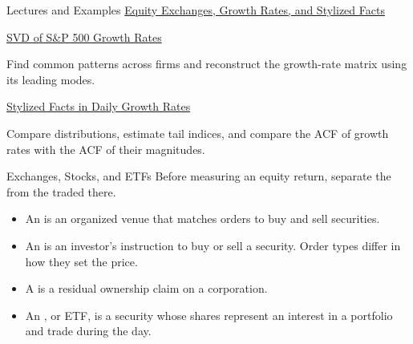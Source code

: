 \documentclass[aspectratio=169,11pt]{beamer}
\begin{document}
\begin{frame}{Lectures and Examples}
  \textbf{}
  \href{https://github.com/varnerlab/CHEME-5660-CourseRepository-Fall-2026/blob/main/lectures/week-3/L3a/CHEME-5660-L3a-Lecture-Equity-Exchanges-Return-StylizedFacts-Fall-2026.ipynb}{Equity Exchanges, Growth Rates, and Stylized Facts}

  \vspace{1.1em}
  \textbf{}
  \href{https://github.com/varnerlab/CHEME-5660-CourseRepository-Fall-2026/blob/main/lectures/week-3/L3a/CHEME-5660-L3a-SVD-SP500-Example-Fall-2026.ipynb}{SVD of S\&P 500 Growth Rates}

  Find common patterns across firms and reconstruct the growth-rate matrix
  using its leading modes.

  \vspace{1.1em}
  \textbf{}
  \href{https://github.com/varnerlab/CHEME-5660-CourseRepository-Fall-2026/blob/main/lectures/week-3/L3a/CHEME-5660-L3a-StylizedFacts-Example-Fall-2026.ipynb}{Stylized Facts in Daily Growth Rates}

  Compare distributions, estimate tail indices, and compare the ACF of
  growth rates with the ACF of their magnitudes.
\end{frame}

\begin{frame}{Exchanges, Stocks, and ETFs}
  \vspace{0.3em}
  Before measuring an equity return, separate the  from the
   traded there.

  \vspace{0.7em}
  \begin{itemize}\setlength{\itemsep}{0.6em}
    \item An  is an organized venue that matches orders to buy
      and sell securities.
    \item An  is an investor's instruction to buy or sell a
      security. Order types differ in how they set the price.
    \item A  is a residual ownership claim on a corporation.
    \item An , or ETF, is a security whose shares
      represent an interest in a portfolio and trade during the day.
  \end{itemize}

\end{frame}
\end{document}
